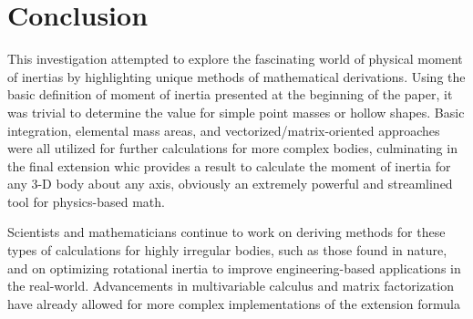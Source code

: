 \section{Conclusion}

This investigation attempted to explore the fascinating world of physical moment of inertias by highlighting unique methods of mathematical derivations. Using the basic definition of moment of inertia presented at the beginning of the paper, it was trivial to determine the value for simple point masses or hollow shapes. Basic integration, elemental mass areas, and vectorized/matrix-oriented approaches were all utilized for further calculations for more complex bodies, culminating in the final extension whic provides a result to calculate the moment of inertia for any 3-D body about any axis, obviously an extremely powerful and streamlined tool for physics-based math. 

Scientists and mathematicians continue to work on deriving methods for these types of calculations for highly irregular bodies, such as those found in nature, and on optimizing rotational inertia to improve engineering-based applications in the real-world. Advancements in multivariable calculus and matrix factorization have already allowed for more complex implementations of the extension formula